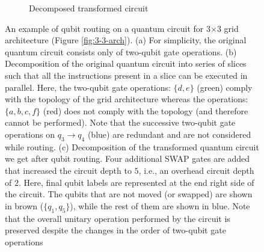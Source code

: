 \documentclass[%
 reprint,
 longbibliography,
 amsmath,amssymb,
 aps,
]{revtex4-2}
\begin{document}
\begin{figure}[t]
\begin{subfigure}[b]{0.33\linewidth}
        \caption{Decomposed transformed circuit\label{fig:transformed_circ}}
    \end{subfigure}
    \caption{An example of qubit routing on a quantum circuit for 3$\times$3 grid architecture (Figure \ref{fig:3-3-arch}). (a) For simplicity, the original quantum circuit consists only of two-qubit gate operations. (b) Decomposition of the original quantum circuit into series of slices such that all the instructions present in a slice can be executed in parallel. Here, the two-qubit gate operations: $\{d,e\}$ (green) comply with the topology of the grid architecture whereas the operations: $\{a, b, c, f\}$ (red) does not comply with the topology (and therefore cannot be performed). Note that the successive two-qubit gate operations on $q_3\rightarrow q_4$ (blue) are redundant and are not considered while routing. (c) Decomposition of the transformed quantum circuit we get after qubit routing. Four additional SWAP gates are added that increased the circuit depth to $5$, i.e., an overhead circuit depth of $2$. Here, final qubit labels are represented at the end right side of the circuit. The qubits that are not moved (or swapped) are shown in brown ($\{q_1, q_5\}$), while the rest of them are shown in blue. Note that the overall unitary operation performed by the circuit is preserved despite the changes in the order of two-qubit gate operations}
    \label{fig:routing-example}
\end{figure}
\end{document}

